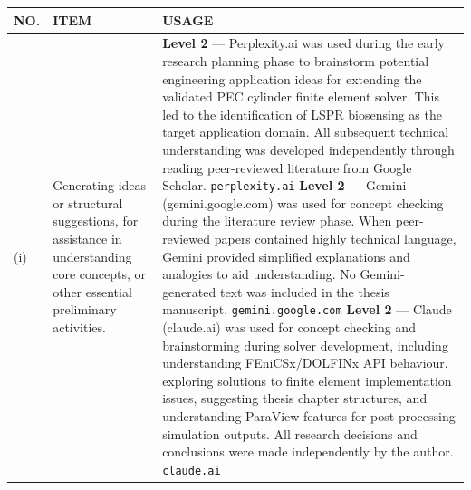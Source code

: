 \noindent\begin{tabular}{|p{}|p{}|p{}|}
\hline
\textbf{NO.} & \textbf{ITEM} & \textbf{USAGE} \\
\hline
(i) &
Generating ideas or structural suggestions, for assistance in understanding core concepts, or other essential preliminary activities. &
\textbf{Level 2} --- Perplexity.ai was used during the early research planning phase to brainstorm potential engineering application ideas for extending the validated PEC cylinder finite element solver. This led to the identification of LSPR biosensing as the target application domain. All subsequent technical understanding was developed independently through reading peer-reviewed literature from Google Scholar.\newline
\texttt{perplexity.ai}\newline\newline
\textbf{Level 2} --- Gemini (gemini.google.com) was used for concept checking during the literature review phase. When peer-reviewed papers contained highly technical language, Gemini provided simplified explanations and analogies to aid understanding. No Gemini-generated text was included in the thesis manuscript.\newline
\texttt{gemini.google.com}\newline\newline
\textbf{Level 2} --- Claude (claude.ai) was used for concept checking and brainstorming during solver development, including understanding FEniCSx/DOLFINx API behaviour, exploring solutions to finite element implementation issues, suggesting thesis chapter structures, and understanding ParaView features for post-processing simulation outputs. All research decisions and conclusions were made independently by the author.\newline
\texttt{claude.ai} \\
\hline
\end{tabular}

\vspace{0pt}

